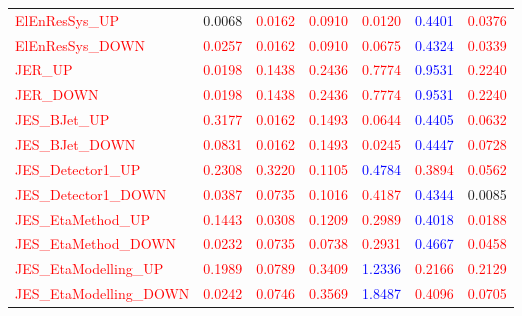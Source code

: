 \documentclass[11pt,oneside,a4paper]{article}
\begin{document}
\begin{table}
\begin{tabular}{lrrrrrr}
\textcolor{red}{ElEnResSys\_UP} & 0.0068 & \textcolor{red}{0.0162} & \textcolor{red}{0.0910} & \textcolor{red}{0.0120} & \textcolor{blue}{0.4401} & \textcolor{red}{0.0376} \\
\textcolor{red}{ElEnResSys\_DOWN} & \textcolor{red}{0.0257} & \textcolor{red}{0.0162} & \textcolor{red}{0.0910} & \textcolor{red}{0.0675} & \textcolor{blue}{0.4324} & \textcolor{red}{0.0339} \\
\textcolor{red}{JER\_UP} & \textcolor{red}{0.0198} & \textcolor{red}{0.1438} & \textcolor{red}{0.2436} & \textcolor{red}{0.7774} & \textcolor{blue}{0.9531} & \textcolor{red}{0.2240} \\
\textcolor{red}{JER\_DOWN} & \textcolor{red}{0.0198} & \textcolor{red}{0.1438} & \textcolor{red}{0.2436} & \textcolor{red}{0.7774} & \textcolor{blue}{0.9531} & \textcolor{red}{0.2240} \\
\textcolor{red}{JES\_BJet\_UP} & \textcolor{red}{0.3177} & \textcolor{red}{0.0162} & \textcolor{red}{0.1493} & \textcolor{red}{0.0644} & \textcolor{blue}{0.4405} & \textcolor{red}{0.0632} \\
\textcolor{red}{JES\_BJet\_DOWN} & \textcolor{red}{0.0831} & \textcolor{red}{0.0162} & \textcolor{red}{0.1493} & \textcolor{red}{0.0245} & \textcolor{blue}{0.4447} & \textcolor{red}{0.0728} \\
\textcolor{red}{JES\_Detector1\_UP} & \textcolor{red}{0.2308} & \textcolor{red}{0.3220} & \textcolor{red}{0.1105} & \textcolor{blue}{0.4784} & \textcolor{red}{0.3894} & \textcolor{red}{0.0562} \\
\textcolor{red}{JES\_Detector1\_DOWN} & \textcolor{red}{0.0387} & \textcolor{red}{0.0735} & \textcolor{red}{0.1016} & \textcolor{red}{0.4187} & \textcolor{blue}{0.4344} & 0.0085 \\
\textcolor{red}{JES\_EtaMethod\_UP} & \textcolor{red}{0.1443} & \textcolor{red}{0.0308} & \textcolor{red}{0.1209} & \textcolor{red}{0.2989} & \textcolor{blue}{0.4018} & \textcolor{red}{0.0188} \\
\textcolor{red}{JES\_EtaMethod\_DOWN} & \textcolor{red}{0.0232} & \textcolor{red}{0.0735} & \textcolor{red}{0.0738} & \textcolor{red}{0.2931} & \textcolor{blue}{0.4667} & \textcolor{red}{0.0458} \\
\textcolor{red}{JES\_EtaModelling\_UP} & \textcolor{red}{0.1989} & \textcolor{red}{0.0789} & \textcolor{red}{0.3409} & \textcolor{blue}{1.2336} & \textcolor{red}{0.2166} & \textcolor{red}{0.2129} \\
\textcolor{red}{JES\_EtaModelling\_DOWN} & \textcolor{red}{0.0242} & \textcolor{red}{0.0746} & \textcolor{red}{0.3569} & \textcolor{blue}{1.8487} & \textcolor{red}{0.4096} & \textcolor{red}{0.0705} \\

\end{tabular}
\end{table}
\end{document}
